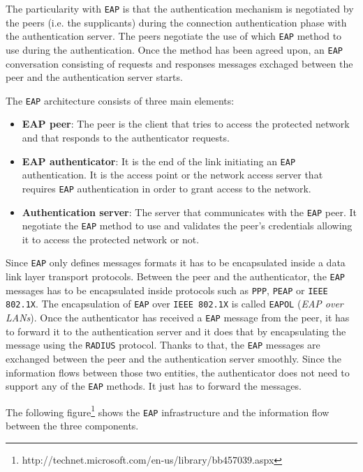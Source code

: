 The particularity with \texttt{EAP} is that the authentication mechanism is negotiated by the peers (i.e. the supplicants) during the connection authentication phase with the authentication server. The peers negotiate the use of which \texttt{EAP} method to use during the authentication. Once the method has been agreed upon, an \texttt{EAP} conversation consisting of requests and responses messages exchaged between the peer and the authentication server starts.

The \texttt{EAP} architecture consists of three main elements:
\begin{itemize}
	\item \textbf{EAP peer}: The peer is the client that tries to access the protected network and that responds to the authenticator requests.
	\item \textbf{EAP authenticator}: It is the end of the link initiating an \texttt{EAP} authentication. It is the access point or the network access server that requires \texttt{EAP} authentication in order to grant access to the network.
	\item \textbf{Authentication server}: The server that communicates with the \texttt{EAP} peer. It negotiate the \texttt{EAP} method to use and validates the peer's credentials allowing it to access the protected network or not.
\end{itemize}

Since \texttt{EAP} only defines messages formats it has to be encapsulated inside a data link layer transport protocols. Between the peer and the authenticator, the \texttt{EAP} messages has to be encapsulated inside protocols such as \texttt{PPP}, \texttt{PEAP} or \texttt{IEEE 802.1X}. The encapsulation of \texttt{EAP} over \texttt{IEEE 802.1X} is called \texttt{EAPOL} (\textit{EAP over LANs}). Once the authenticator has received a \texttt{EAP} message from the peer, it has to forward it to the authentication server and it does that by encapsulating the message using the \texttt{RADIUS} protocol. Thanks to that, the \texttt{EAP} messages are exchanged between the peer and the authentication server smoothly. Since the information flows between those two entities, the authenticator does not need to support any of the \texttt{EAP} methods. It just has to forward the messages.

The following figure\footnote{http://technet.microsoft.com/en-us/library/bb457039.aspx} shows the \texttt{EAP} infrastructure and the information flow between the three components.

